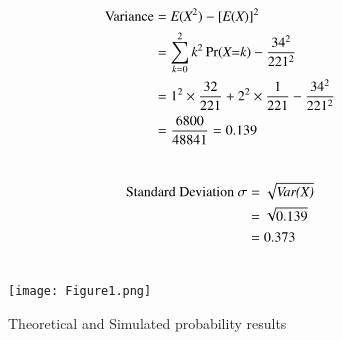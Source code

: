 \documentclass[journal,12pt,twocolumn]{IEEEtran}
\begin{document}
\begin{align}
\nonumber\text{Variance} &=\emph{E}(\emph{X}^2) - [\emph{E}(\emph{X})]^2\\\nonumber
                  &= \sum_{\emph{k}=0}^{2} \emph{k}^2 \Pr(\emph{X=k}) - \frac{34^2}{221^2}\\\nonumber
                  &= 1^2\times\frac{32}{221} + 2^2\times\frac{1}{221} - \frac{34^2}{221^2}\\\vspace{0.1cm}
                  &= \frac{6800}{48841} = 0.139\\\nonumber
\end{align}

\begin{align}
\nonumber\text{Standard Deviation }\sigma &= \sqrt{\emph{Var(X)}}\\ \nonumber
&= \sqrt{0.139}\\ &= 0.373\\\nonumber
\end{align}

\newpage
\begin{figure}[h!]
    \texttt{[image: Figure1.png]}
    \caption{\large Theoretical and Simulated probability results}
\end{figure}
\end{document}
